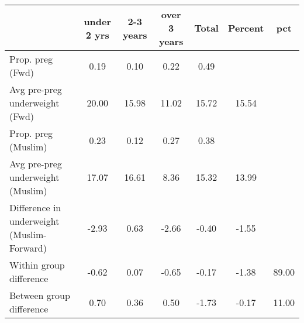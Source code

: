 \begin{tabular}{l*{6}{c}}
\toprule
            &\multicolumn{1}{c}{under 2 yrs}&\multicolumn{1}{c}{2-3 years}&\multicolumn{1}{c}{over 3 years}&\multicolumn{1}{c}{Total}&\multicolumn{1}{c}{Percent}&\multicolumn{1}{c}{pct}\\
\midrule
\midrule
Prop. preg (Fwd)&        0.19&        0.10&        0.22&        0.49&            &            \\
Avg pre-preg underweight (Fwd)&       20.00&       15.98&       11.02&       15.72&       15.54&            \\
Prop. preg (Muslim)&        0.23&        0.12&        0.27&        0.38&            &            \\
Avg pre-preg underweight (Muslim)&       17.07&       16.61&        8.36&       15.32&       13.99&            \\
Difference in underweight (Muslim-Forward)&       -2.93&        0.63&       -2.66&       -0.40&       -1.55&            \\
Within group difference&       -0.62&        0.07&       -0.65&       -0.17&       -1.38&       89.00\\
Between group difference&        0.70&        0.36&        0.50&       -1.73&       -0.17&       11.00\\
\bottomrule
\end{tabular}
